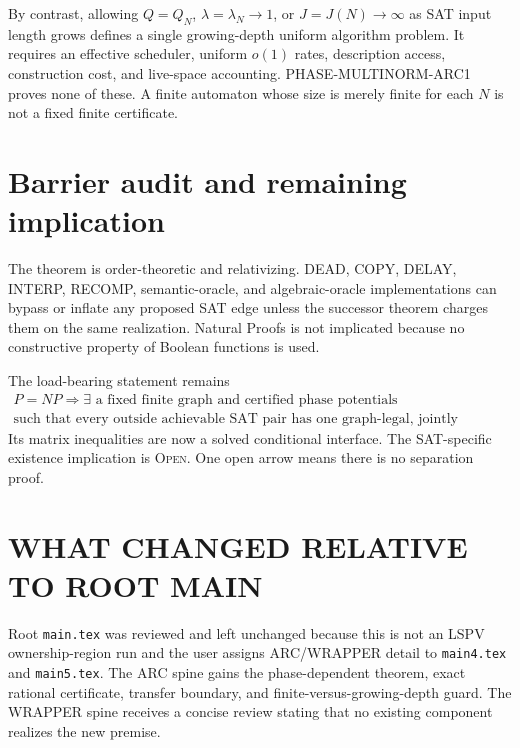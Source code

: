\documentclass[11pt]{article}
\begin{document}
By contrast, allowing \(Q=Q_N\), \(\lambda=\lambda_N\to1\), or
\(J=J(N)\to\infty\) as SAT input length grows defines a single
growing-depth uniform algorithm problem.  It requires an effective scheduler,
uniform \(o(1)\) rates, description access, construction cost, and live-space
accounting.  PHASE-MULTINORM-ARC1 proves none of these.  A finite automaton
whose size is merely finite for each \(N\) is not a fixed finite certificate.

\section{Barrier audit and remaining implication}
The theorem is order-theoretic and relativizing.  DEAD, COPY, DELAY, INTERP,
RECOMP, semantic-oracle, and algebraic-oracle implementations can bypass or
inflate any proposed SAT edge unless the successor theorem charges them on
the same realization.  Natural Proofs is not implicated because no
constructive property of Boolean functions is used.

The load-bearing statement remains
\[
\boxed{\begin{gathered}
P=NP\Longrightarrow \exists\text{ a fixed finite graph and certified
phase potentials}\\
\text{such that every outside achievable SAT pair has one graph-legal,
jointly witnessed successor.}
\end{gathered}}
\]
Its matrix inequalities are now a solved conditional interface.  The
SAT-specific existence implication is \textsc{Open}.  One open arrow means
there is no separation proof.

\section{WHAT CHANGED RELATIVE TO ROOT MAIN}
Root \texttt{main.tex} was reviewed and left unchanged because this is not an
LSPV ownership-region run and the user assigns ARC/WRAPPER detail to
\texttt{main4.tex} and \texttt{main5.tex}.  The ARC spine gains the
phase-dependent theorem, exact rational certificate, transfer boundary, and
finite-versus-growing-depth guard.  The WRAPPER spine receives a concise
review stating that no existing component realizes the new premise.
\end{document}
